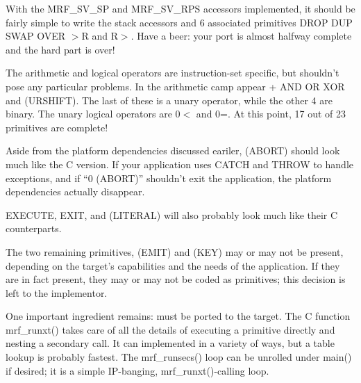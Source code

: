 \documentclass{article}
\begin{document}
With the MRF\_SV\_SP and MRF\_SV\_RPS accessors implemented, it should
be fairly simple to write the stack accessors and 6 associated
primitives DROP DUP SWAP OVER $>$R and R$>$. Have a beer: your port is
almost halfway complete and the hard part is over!

The arithmetic and logical operators are instruction-set specific, but
shouldn't pose any particular problems. In the arithmetic camp appear +
AND OR XOR and (URSHIFT). The last of these is a unary operator, while
the other 4 are binary. The unary logical operators are 0$<$ and 0=. At
this point, 17 out of 23 primitives are complete!

Aside from the platform dependencies discussed eariler, (ABORT) should
look much like the C version. If your application uses CATCH and THROW
to handle exceptions, and if ``0 (ABORT)'' shouldn't exit the
application, the platform dependencies actually disappear.

EXECUTE, EXIT, and (LITERAL) will also probably look much like their C
counterparts.

The two remaining primitives, (EMIT) and (KEY) may or may not be
present, depending on the target's capabilities and the needs of the
application. If they are in fact present, they may or may not be coded
as primitives; this decision is left to the implementor.

One important ingredient remains:  must be ported to the
target. The C function mrf\_runxt() takes care of all the details of
executing a primitive directly and nesting a secondary call. It can
implemented in a variety of ways, but a table lookup is probably
fastest. The mrf\_runsecs() loop can be unrolled under main() if
desired; it is a simple IP-banging, mrf\_runxt()-calling loop.
\end{document}
